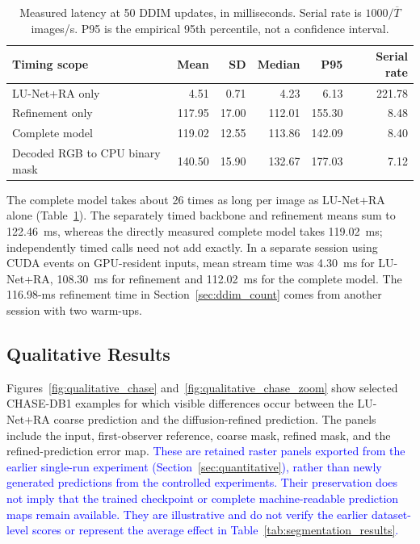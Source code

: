 \documentclass[jimaging,article,submit,pdftex,moreauthors]
  {Definitions/mdpi}
\DeclareRobustCommand{\rev}[1]{\textcolor{blue}{#1}}
\newcommand{\revbegin}{\begingroup\color{blue}}
\DeclareRobustCommand{\rev}[1]{#1}
\newcommand{\revbegin}{\begingroup}
\newcommand{\revend}{\ifhmode\par\fi\endgroup}
\providecommand{\linelabel}[1]{}
\newcommand{\seclabel}[1]{\linelabel{rev:sec:#1}}
\newcommand{\secend}[1]{\linelabel{rev:end:#1}}
\begin{document}
\begin{table}[htbp]\revbegin{}
\centering
\caption{Measured latency at 50 DDIM updates, in milliseconds. Serial rate is $1000/\overline{T}$ images/s. P95 is the empirical 95th percentile, not a confidence interval.}
\label{tab:latency}
\small
\begin{tabular}{lrrrrr}
\toprule
Timing scope & Mean & SD & Median & P95 & Serial rate \\
\midrule
LU-Net+RA only & 4.51 & 0.71 & 4.23 & 6.13 & 221.78 \\
Refinement only & 117.95 & 17.00 & 112.01 & 155.30 & 8.48 \\
Complete model & 119.02 & 12.55 & 113.86 & 142.09 & 8.40 \\
Decoded RGB to CPU binary mask & 140.50 & 15.90 & 132.67 & 177.03 & 7.12 \\
\bottomrule
\end{tabular}
\revend{}\end{table}

The complete model takes about 26 times as long per image as LU-Net+RA alone (Table~\ref{tab:latency}). The separately timed backbone and refinement means sum to 122.46~ms, whereas the directly measured complete model takes 119.02~ms; independently timed calls need not add exactly. In a separate session using CUDA events on GPU-resident inputs, mean stream time was 4.30~ms for LU-Net+RA, 108.30~ms for refinement and 112.02~ms for the complete model. The 116.98-ms refinement time in Section~\ref{sec:ddim_count} comes from another session with two warm-ups.\secend{latency}\revend{}

\subsection{Qualitative Results}
\label{sec:qualitative}
\seclabel{qualitative}

Figures~\ref{fig:qualitative_chase} and~\ref{fig:qualitative_chase_zoom} show selected CHASE-DB1 examples for which visible differences occur between the LU-Net+RA coarse prediction and the diffusion-refined prediction. The panels include the input, first-observer reference, coarse mask, refined mask, and the refined-prediction error map. \rev{These are retained raster panels exported from the earlier single-run experiment (Section~\ref{sec:quantitative}), rather than newly generated predictions from the controlled experiments. Their preservation does not imply that the trained checkpoint or complete machine-readable prediction maps remain available. They are illustrative and do not verify the earlier dataset-level scores or represent the average effect in Table~\ref{tab:segmentation_results}.}
\end{document}
